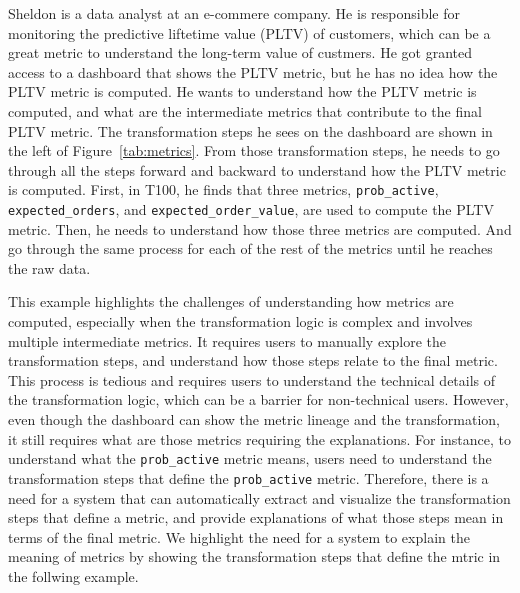 

\begin{example}
Sheldon is a data analyst at an e-commere company. He is responsible for
monitoring the predictive liftetime value (PLTV) of customers, which can be a
great metric to understand the long-term value of custmers. He got granted
access to a dashboard that shows the PLTV metric, but he has no idea how the
PLTV metric is computed. He wants to understand how the PLTV metric is computed,
and what are the intermediate metrics that contribute to the final PLTV metric.
The transformation steps he sees on the dashboard are shown in the left of
Figure~\ref{tab:metrics}. From those transformation steps, he needs to go
through all the steps forward and backward to understand how the PLTV metric is
computed. First, in T100, he finds that three metrics, \texttt{prob\_active},
\texttt{expected\_orders}, and \texttt{expected\_order\_value}, are used to
compute the PLTV metric. Then, he needs to understand how those three metrics
are computed. And go through the same process for each of the rest of the
metrics until he reaches the raw data. 
\end{example}

This example highlights the challenges of understanding how metrics are
computed, especially when the transformation logic is complex and involves
multiple intermediate metrics. It requires users to manually explore the
transformation steps, and understand how those steps relate to the final metric.
This process is tedious and requires users to understand the technical details
of the transformation logic, which can be a barrier for non-technical users.
However, even though the dashboard can show the metric lineage and the
transformation, it still requires what are those metrics requiring the
explanations. For instance, to understand what the \texttt{prob\_active} metric
means, users need to understand the transformation steps that define the
\texttt{prob\_active} metric. Therefore, there is a need for a system that can
automatically extract and visualize the transformation steps that define a
metric, and provide explanations of what those steps mean in terms of the final
metric. We highlight the need for a system to explain the meaning of metrics by
showing the transformation steps that define the mtric in the follwing example.

